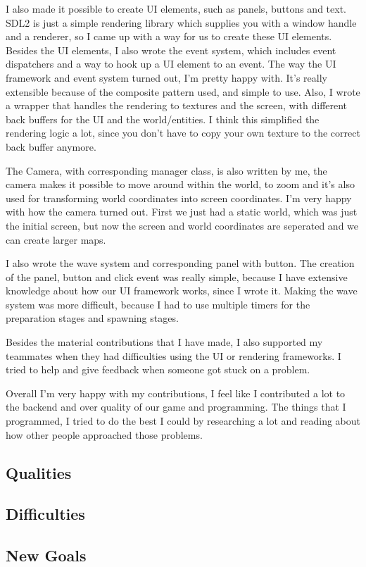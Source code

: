 I also made it possible to create UI elements, such as panels, buttons and 
text. SDL2 is just a simple rendering library which supplies 
you with a window handle and a renderer, so I came up with a way for us to 
create these UI elements. Besides the UI elements, I also wrote the event 
system, which includes event dispatchers and a way to hook up a UI element 
to an event. The way the UI framework and event system turned out, I'm pretty 
happy with. It's really extensible because of the composite pattern used, and 
simple to use.
Also, I wrote a wrapper that handles the rendering to textures and the 
screen, with different back buffers for the UI and the world/entities. I 
think this simplified the rendering logic a lot, since you don't have to copy 
your own texture to the correct back buffer anymore.

The Camera, with corresponding manager class, is also written by me, the 
camera makes it possible to move around within the world, to zoom and it's 
also used for transforming world coordinates into screen coordinates. I'm 
very happy with how the camera turned out. First we just had a static world, 
which was just the initial screen, but now the screen and world coordinates 
are seperated and we can create larger maps.

I also wrote the wave system and corresponding panel with button. 
The creation of the panel, button and click event was really simple, because 
I have extensive knowledge about how our UI framework works, since I wrote it.
Making the wave system was more difficult, because I had to use multiple 
timers for the preparation stages and spawning stages.

Besides the material contributions that I have made, I also supported my teammates 
when they had difficulties using the UI or rendering frameworks. I tried to 
help and give feedback when someone got stuck on a problem.

Overall I'm very happy with my contributions, I feel like I contributed a lot 
to the backend and over quality of our game and programming. The things that 
I programmed, I tried to do the best I could by researching a lot and reading 
about how other people approached those problems.

\subsection{Qualities}

\subsection{Difficulties}
\subsection{New Goals}

